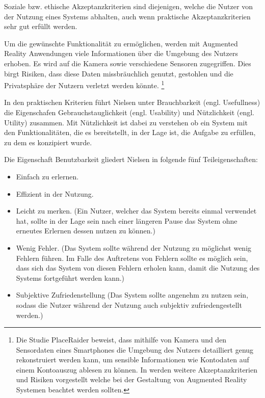 Soziale bzw. ethische Akzeptanzkriterien sind diejenigen, welche die Nutzer von der Nutzung eines Systems abhalten, auch wenn praktische Akzeptanzkriterien sehr gut erfüllt werden. 

Um die gewünschte Funktionalität zu ermöglichen, werden mit Augmented Reality Anwendungen viele Informationen über die Umgebung des Nutzers erhoben.\cite[S.~3]{Roesner2013} Es wird auf die Kamera sowie verschiedene Sensoren zugegriffen. Dies birgt Risiken, dass diese Daten missbräuchlich genutzt, gestohlen und die Privatsphäre der Nutzern verletzt werden könnte. \footnote{Die Studie PlaceRaider \cite[S.~9]{Templeman2012} beweist, dass mithilfe von Kamera und den Sensordaten eines Smartphones die Umgebung des Nutzers detailliert genug rekonstruiert werden kann, um sensible Informationen wie Kontodaten auf einem Kontoauszug ablesen zu können. In \cite{Roesner2013,Lebeck2018} werden weitere Akzeptanzkriterien und Risiken vorgestellt welche bei der Gestaltung von Augmented Reality Systemen beachtet werden sollten.}

In den praktischen Kriterien führt Nielsen unter Brauchbarkeit (engl. Usefullness) die Eigenschafen Gebrauchstauglichkeit (engl. Usability) und Nützlichkeit (engl. Utility) zusammen. 
Mit Nützlichkeit ist dabei zu verstehen ob ein System mit den Funktionalitäten, die es bereitstellt, in der Lage ist, die Aufgabe zu erfüllen, zu dem es konzipiert wurde.

Die Eigenschaft Benutzbarkeit gliedert Nielsen in folgende fünf Teileigenschaften: 

\begin{itemize}
	\item Einfach zu erlernen.
	\item Effizient in der Nutzung.
	\item Leicht zu merken. (Ein Nutzer, welcher das System bereits einmal verwendet hat, sollte in der Lage sein nach einer längeren Pause das System ohne erneutes Erlernen dessen nutzen zu können.)
	\item Wenig Fehler. (Das System sollte während der Nutzung zu möglichst wenig Fehlern führen. Im Falle des Auftretens von Fehlern sollte es möglich sein, dass sich das System von diesen Fehlern erholen kann, damit die Nutzung des Systems fortgeführt werden kann.)
	\item Subjektive Zufriedenstellung (Das System sollte angenehm zu nutzen sein, sodass die Nutzer während der Nutzung auch subjektiv zufriedengestellt werden.)
\end{itemize}


